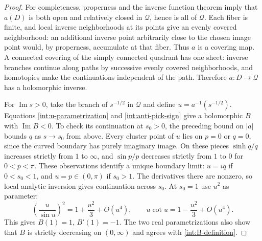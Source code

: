 \documentclass[11pt]{article}
\theoremstyle{remark}\newtheorem{remark}[theorem]{Remark}
\begin{document}
\begin{proof}
For completeness, properness and the inverse function theorem imply
that $a(D)$ is both open and relatively closed in $\mathcal Q$, hence
is all of $\mathcal Q$.  Each fiber is finite, and local inverse
neighborhoods at its points give an evenly covered neighborhood: an
additional inverse point arbitrarily close to the chosen image point
would, by properness, accumulate at that fiber.  Thus $a$ is a covering
map.  A connected covering of the simply connected quadrant has one
sheet: inverse branches continue along paths by successive evenly
covered neighborhoods, and homotopies make the continuations
independent of the path.  Therefore $a:D\to\mathcal Q$ has a
holomorphic inverse.

For $\operatorname{Im}s>0$, take the branch of $s^{-1/2}$ in
$\mathcal Q$ and define $u=a^{-1}(s^{-1/2})$.  Equations
\eqref{int:u-parametrization} and \eqref{int:anti-pick-sign} give a
holomorphic $B$ with $\operatorname{Im}B<0$.
To check its continuation at $s_0>0$, the preceding bound on $|a|$
bounds $q$ as $s\to s_0$ from above.  Every cluster point of $u$ lies
on $p=0$ or $q=0$, since the curved boundary has purely imaginary
image.  On these pieces $\sinh q/q$ increases strictly from $1$ to
$\infty$, and $\sin p/p$ decreases strictly from $1$ to $0$ for
$0<p<\pi$.  These observations identify a unique boundary limit:
$u=iq$ if $0<s_0<1$, and $u=p\in(0,\pi)$ if $s_0>1$.
The derivatives there are nonzero, so local analytic inversion gives
continuation across $s_0$.  At $s_0=1$ use $u^2$ as parameter:
\[
 \left(\frac{u}{\sin u}\right)^2=1+\frac{u^2}{3}+O(u^4),
 \qquad u\cot u=1-\frac{u^2}{3}+O(u^4).
\]
This gives $B(1)=1$, $B'(1)=-1$.  The two real parametrizations
also show that $B$ is strictly decreasing on $(0,\infty)$ and agrees
with \eqref{int:B-definition}.


\end{proof}
\end{document}
